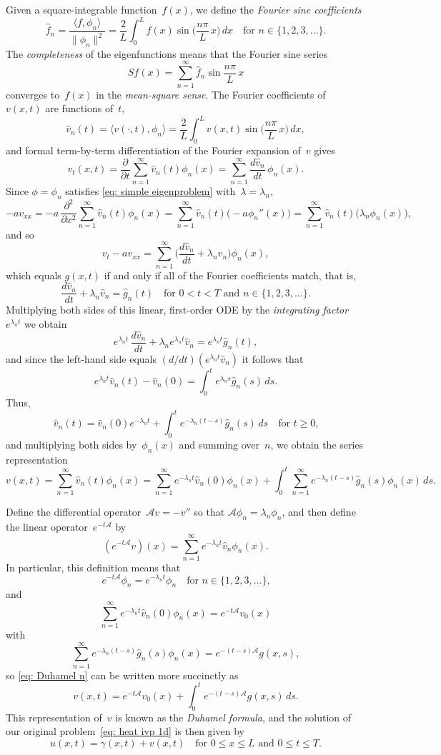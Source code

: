Given a square-integrable function~$f(x)$, we define the 
\emph{Fourier sine coefficients}
\[
\hat f_n=\frac{\langle f,\phi_n\rangle}{\|\phi_n\|^2}
    =\frac{2}{L}\int_0^Lf(x)\sin\biggl(\frac{n\pi}{L}\,x\biggr)\,dx
    \quad\text{for $n\in\{1,2,3,\ldots\}$.}
\]
The \emph{completeness} of the eigenfunctions means that the Fourier sine series
\[
Sf(x)=\sum_{n=1}^\infty\hat f_n\sin\frac{n\pi}{L}\,x
\]
converges to~$f(x)$ in the \emph{mean-square sense}.  The Fourier coefficients 
of~$v(x,t)$ are functions of~$t$,
\[
\hat v_n(t)=\langle v(\cdot,t),\phi_n\rangle
    =\frac{2}{L}\int_0^Lv(x,t)\sin\biggl(\frac{n\pi}{L}\,x\biggr)\,dx,
\]
and formal term-by-term differentiation of the Fourier expansion of~$v$ gives
\[
v_t(x,t)=\frac{\partial}{\partial t}\sum_{n=1}^\infty\hat v_n(t)\phi_n(x)
    =\sum_{n=1}^\infty\frac{d\hat v_n}{dt}\,\phi_n(x).
\]
Since $\phi=\phi_n$ satisfies \eqref{eq: simple eigenproblem} 
with~$\lambda=\lambda_n$,
\[
-av_{xx}=-a\,\frac{\partial^2}{\partial x^2}
    \sum_{n=1}^\infty\hat v_n(t)\phi_n(x)
    =\sum_{n=1}^\infty\hat v_n(t)\bigl(-a\phi_n''(x)\bigr)
    =\sum_{n=1}^\infty\hat v_n(t)\bigl(\lambda_n\phi_n(x)\bigr),
\]
and so
\[
v_t-av_{xx}=\sum_{n=1}^\infty
	\biggl(\frac{d\hat v_n}{dt}+\lambda_n\hat v_n\biggr)\phi_n(x),
\]
which equals $g(x,t)$ if and only if all of the Fourier coefficients match, 
that is,
\[
\frac{d\hat v_n}{dt}+\lambda_n\hat v_n=\hat g_n(t)
    \quad\text{for $0<t<T$ and $n\in\{1,2,3,\ldots\}$.}
\]
Multiplying both sides of this linear, first-order ODE by the 
\emph{integrating factor}~$e^{\lambda_n t}$ we obtain
\[
e^{\lambda_nt}\,\frac{d\hat v_n}{dt}+\lambda_ne^{\lambda_nt}\hat v_n
	=e^{\lambda_nt}\hat g_n(t),
\]
and since the left-hand side equals $(d/dt)(e^{\lambda_nt}\hat v_n)$ it 
follows that
\[
e^{\lambda_nt}\hat v_n(t)-\hat v_n(0)=\int_0^te^{\lambda_ns}\hat g_n(s)\,ds.
\]
Thus,
\begin{equation}\label{eq: Duhamel n}
\hat v_n(t)=\hat v_n(0)e^{-\lambda_nt}
	+\int_0^te^{-\lambda_n(t-s)}\hat g_n(s)\,ds\quad\text{for $t\ge0$,}
\end{equation}
and multiplying both sides by~$\phi_n(x)$ and summing over~$n$, we obtain the
series representation
\[
v(x,t)=\sum_{n=1}^\infty\hat v_n(t)\phi_n(x)
	=\sum_{n=1}^\infty e^{-\lambda_nt}\hat v_n(0)\phi_n(x)
	+\int_0^t\sum_{n=1}^\infty e^{-\lambda_n(t-s)}\hat g_n(s)\phi_n(x)\,ds.
\]

Define the differential operator~$\mathcal{A}v=-v''$ so that 
$\mathcal{A}\phi_n=\lambda_n\phi_n$, and then define the linear 
operator~$e^{-t\mathcal{A}}$ by
\[
(e^{-t\mathcal{A}}v)(x)=\sum_{n=1}^\infty e^{-\lambda_nt}\hat v_n\phi_n(x).
\]
In particular, this definition means that
\[
e^{-t\mathcal{A}}\phi_n=e^{-\lambda_nt}\phi_n
	\quad\text{for $n\in\{1,2,3,\ldots\}$,}
\]
and
\[
\sum_{n=1}^\infty e^{-\lambda_nt}\hat v_n(0)\phi_n(x)=e^{-t\mathcal{A}}v_0(x)
\]
with
\[
\sum_{n=1}^\infty e^{-\lambda_n(t-s)}\hat g_n(s)\phi_n(x)
	=e^{-(t-s)\mathcal{A}}g(x,s),
\]
so \eqref{eq: Duhamel n} can be written more succinctly as
\[
v(x,t)=e^{-t\mathcal{A}}v_0(x)+\int_0^te^{-(t-s)\mathcal{A}}g(x,s)\,ds.
\]
This representation of~$v$ is known as the \emph{Duhamel formula}, and the 
solution of our original problem~\eqref{eq: heat ivp 1d} is then given by
\[
u(x,t)=\gamma(x,t)+v(x,t)\quad\text{for $0\le x\le L$ and $0\le t\le T$.}
\]

